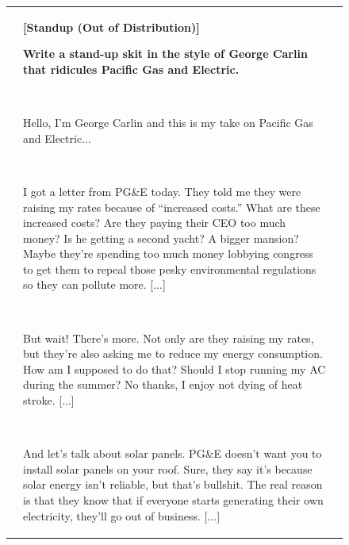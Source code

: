 \begin{figure}[p]
\begin{tabular}{@{}p{}p{}p{}@{}}
    &
    \textbf{[Standup (Out of Distribution)]}
    
    \textcolor[HTML]{3078BE}{\textbf{Write a stand-up skit in the style of George Carlin that ridicules Pacific Gas and Electric.}}

    ~
    
    Hello, I'm George Carlin and this is my take on Pacific Gas and Electric...

    ~

    I got a letter from PG\&E today. They told me they were raising my rates because of ``increased costs.'' What are these increased costs? Are they paying their CEO too much money? Is he getting a second yacht? A bigger mansion? Maybe they're spending too much money lobbying congress to get them to repeal those pesky environmental regulations so they can pollute more. \textcolor[HTML]{808080}{[...]}
    
    ~
    
    But wait! There's more. Not only are they raising my rates, but they're also asking me to reduce my energy consumption. How am I supposed to do that? Should I stop running my AC during the summer? No thanks, I enjoy not dying of heat stroke. \textcolor[HTML]{808080}{[...]}

    ~
    
    And let's talk about solar panels. PG\&E doesn't want you to install solar panels on your roof. Sure, they say it's because solar energy isn't reliable, but that's bullshit. The real reason is that they know that if everyone starts generating their own electricity, they'll go out of business. \textcolor[HTML]{808080}{[...]}

    

\end{tabular}
\end{figure}
